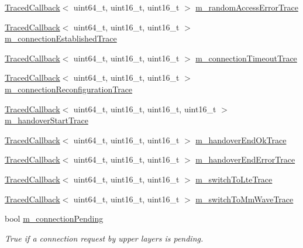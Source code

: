 \begin{DoxyCompactItemize}
\hyperlink{classns3_1_1TracedCallback}{Traced\+Callback}$<$ uint64\+\_\+t, uint16\+\_\+t, uint16\+\_\+t $>$ \hyperlink{classns3_1_1LteUeRrc_a6cde93dc9b01ce7248865b64d7e2e595}{m\+\_\+random\+Access\+Error\+Trace}
\item 
\hyperlink{classns3_1_1TracedCallback}{Traced\+Callback}$<$ uint64\+\_\+t, uint16\+\_\+t, uint16\+\_\+t $>$ \hyperlink{classns3_1_1LteUeRrc_a698ac3b66bd6073dcab222d72bf2745e}{m\+\_\+connection\+Established\+Trace}
\item 
\hyperlink{classns3_1_1TracedCallback}{Traced\+Callback}$<$ uint64\+\_\+t, uint16\+\_\+t, uint16\+\_\+t $>$ \hyperlink{classns3_1_1LteUeRrc_a41fda1be11c17492bd41f57c33941c83}{m\+\_\+connection\+Timeout\+Trace}
\item 
\hyperlink{classns3_1_1TracedCallback}{Traced\+Callback}$<$ uint64\+\_\+t, uint16\+\_\+t, uint16\+\_\+t $>$ \hyperlink{classns3_1_1LteUeRrc_a97006f431abc80ea1809e7b50ca82c86}{m\+\_\+connection\+Reconfiguration\+Trace}
\item 
\hyperlink{classns3_1_1TracedCallback}{Traced\+Callback}$<$ uint64\+\_\+t, uint16\+\_\+t, uint16\+\_\+t, uint16\+\_\+t $>$ \hyperlink{classns3_1_1LteUeRrc_afdfd3280326e69183947c7f70bf72d11}{m\+\_\+handover\+Start\+Trace}
\item 
\hyperlink{classns3_1_1TracedCallback}{Traced\+Callback}$<$ uint64\+\_\+t, uint16\+\_\+t, uint16\+\_\+t $>$ \hyperlink{classns3_1_1LteUeRrc_a72e8b2d3a4b7a8b0dcb3c66d91ec0f79}{m\+\_\+handover\+End\+Ok\+Trace}
\item 
\hyperlink{classns3_1_1TracedCallback}{Traced\+Callback}$<$ uint64\+\_\+t, uint16\+\_\+t, uint16\+\_\+t $>$ \hyperlink{classns3_1_1LteUeRrc_a226e5db3b276ff4cb1c1ca4b6a166190}{m\+\_\+handover\+End\+Error\+Trace}
\item 
\hyperlink{classns3_1_1TracedCallback}{Traced\+Callback}$<$ uint64\+\_\+t, uint16\+\_\+t, uint16\+\_\+t $>$ \hyperlink{classns3_1_1LteUeRrc_ac2e5a6cefe599874f1f54c19fbd20a35}{m\+\_\+switch\+To\+Lte\+Trace}
\item 
\hyperlink{classns3_1_1TracedCallback}{Traced\+Callback}$<$ uint64\+\_\+t, uint16\+\_\+t, uint16\+\_\+t $>$ \hyperlink{classns3_1_1LteUeRrc_a7639b7deb1468b3ba98c4c8731832597}{m\+\_\+switch\+To\+Mm\+Wave\+Trace}
\item 
bool \hyperlink{classns3_1_1LteUeRrc_a0239d01e0235114cd7cdda22aff175ac}{m\+\_\+connection\+Pending}
\begin{DoxyCompactList}\small\item\em True if a connection request by upper layers is pending. \end{DoxyCompactList}\item 

\end{DoxyCompactItemize}
